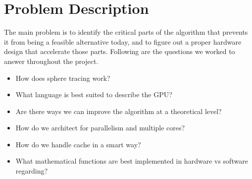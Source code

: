 \chapter{Problem Description}

	The main problem is to identify the critical parts of the algorithm that
	prevents it from being a feasible alternative today, and to figure out a
	proper hardware design that accelerate those parts. Following are the
	questions we worked to answer throughout the project.
	
	\begin{itemize}
		\item How does sphere tracing work?
		\item What language is best suited to describe the GPU?
		\item Are there ways we can improve the algorithm at a theoretical 
			level?
		\item How do we architect for parallelism and multiple cores?
		\item How do we handle cache in a smart way?
		\item What mathematical functions are best implemented in hardware vs 
			software regarding?
	\end{itemize}
